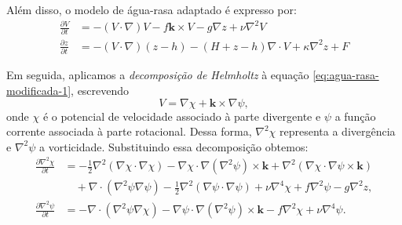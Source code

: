 Além disso, o modelo de água-rasa adaptado é expresso por:
\begin{align}
	\frac{\partial V}{\partial t} & = - ( V \cdot \nabla)V - f \mathbf{k} \times V - g \nabla z + \nu \nabla^2 V \label{eq:agua-rasa-modificada-1}     \\
	\frac{\partial z}{\partial t} & = - (V \cdot \nabla)(z - h) - (H + z - h)\nabla \cdot  V + \kappa \nabla^2 z + F \label{eq:agua-rasa-modificada-2} 
\end{align}


Em seguida, aplicamos a \textit{decomposição de Helmholtz} à equação \eqref{eq:agua-rasa-modificada-1}, escrevendo
\begin{equation*}
	V = \nabla \chi + \mathbf{k} \times \nabla \psi,
\end{equation*}
onde $\chi$ é o potencial de velocidade associado à parte divergente e $\psi$ a função corrente associada à parte rotacional. Dessa forma, $\nabla^2 \chi$ representa a divergência e $\nabla^2 \psi$ a vorticidade. Substituindo essa decomposição obtemos:
\begin{align}
	\frac{\partial \nabla^2 \chi}{\partial t} & = -\tfrac{1}{2}\nabla^2(\nabla \chi \cdot \nabla \chi) 
	- \nabla \chi \cdot \nabla(\nabla^2\psi) \times \mathbf{k} 
	+ \nabla^2(\nabla \chi \cdot \nabla \psi \times \mathbf{k}) \nonumber \\
    & \quad + \nabla \cdot (\nabla^2\psi\nabla\psi)          
	- \tfrac{1}{2}\nabla^2(\nabla \psi \cdot \nabla \psi) 
	+ \nu\nabla^4\chi + f\nabla^2\psi - g\nabla^2z, \label{eq:equacao-basica-1} \\
	\frac{\partial \nabla^2 \psi}{\partial t} & = -\nabla \cdot (\nabla^2\psi\nabla \chi)              
	- \nabla \psi \cdot \nabla(\nabla^2\psi) \times \mathbf{k} 
	- f\nabla^2\chi + \nu\nabla^4\psi. \label{eq:equacao-basica-2}
\end{align}

